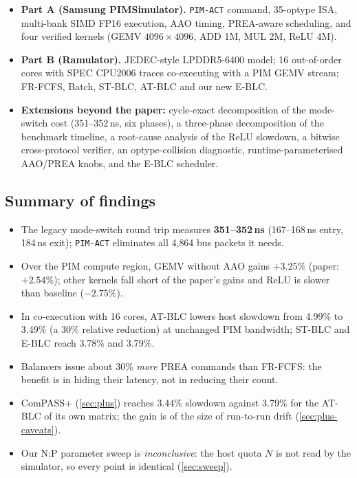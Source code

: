 \documentclass[conference]{IEEEtran}
\newcommand{\cmd}[1]{\texttt{\footnotesize #1}}
\newcommand{\pimact}{\cmd{PIM-ACT}\xspace}
\newcommand{\stblc}{ST-BLC}
\newcommand{\atblc}{AT-BLC}
\newcommand{\eblc}{E-BLC}
\begin{document}
\begin{itemize}
\item \textbf{Part A (Samsung PIMSimulator).} \pimact command, 35-optype ISA, multi-bank SIMD FP16 execution, AAO timing, PREA-aware scheduling, and four verified kernels (GEMV $4096{\times}4096$, ADD 1M, MUL 2M, ReLU 4M).
\item \textbf{Part B (Ramulator).} JEDEC-style LPDDR5-6400 model; 16 out-of-order cores with SPEC CPU2006 traces co-executing with a PIM GEMV stream; FR-FCFS, Batch, \stblc, \atblc{} and our new \eblc.
\item \textbf{Extensions beyond the paper:} cycle-exact decomposition of the mode-switch cost (351--352\,ns, six phases), a three-phase decomposition of the benchmark timeline, a root-cause analysis of the ReLU slowdown, a bitwise cross-protocol verifier, an optype-collision diagnostic, runtime-parameterised AAO/PREA knobs, and the \eblc{} scheduler.
\end{itemize}

\subsection{Summary of findings}
\begin{itemize}
\item The legacy mode-switch round trip measures \textbf{351--352\,ns} (167--168\,ns entry, 184\,ns exit); \pimact eliminates all 4{,}864 bus packets it needs.
\item Over the PIM compute region, GEMV without AAO gains $+3.25\%$ (paper: $+2.54\%$); other kernels fall short of the paper's gains and ReLU is slower than baseline ($-2.75\%$).
\item In co-execution with 16 cores, \atblc{} lowers host slowdown from 4.99\% to 3.49\% (a 30\% relative reduction) at unchanged PIM bandwidth; \stblc{} and \eblc{} reach 3.78\% and 3.79\%.
\item Balancers issue about 30\% \emph{more} PREA commands than FR-FCFS: the benefit is in hiding their latency, not in reducing their count.
\item ComPASS+ (\cref{sec:plus}) reaches 3.44\% slowdown against 3.79\% for the AT-BLC of its own matrix; the gain is of the size of run-to-run drift (\cref{sec:plus-caveats}).
\item Our N:P parameter sweep is \emph{inconclusive}: the host quota $N$ is not read by the simulator, so every point is identical (\cref{sec:sweep}).
\end{itemize}
\end{document}
